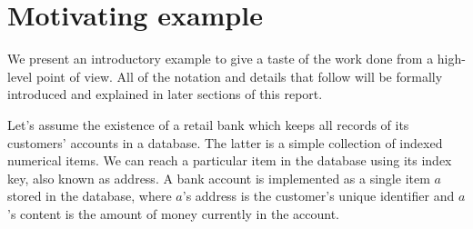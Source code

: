 \chapter{Motivating example}

We present an introductory example to give a taste of the work done from a high-level point of view. All of the notation and details that follow will be formally introduced and explained in later sections of this report.

Let's assume the existence of a retail bank which keeps all records of its customers' accounts in a database. The latter is a simple collection of indexed numerical items. We can reach a particular item in the database using its index key, also known as address. A bank account is implemented as a single item $a$ stored in the database, where $a$'s address is the customer's unique identifier and $a$'s content is the amount of money currently in the account.

